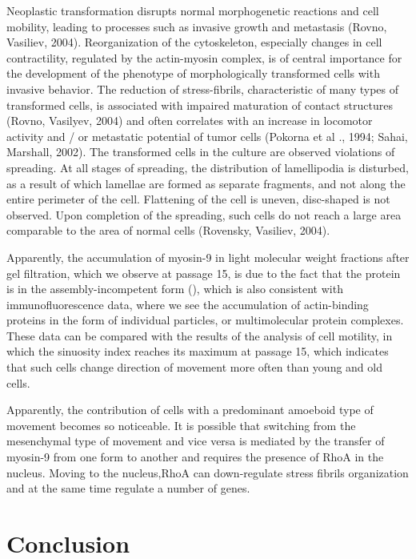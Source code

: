 \documentclass[english,authoryear]{elsarticle}
\begin{document}
Neoplastic transformation disrupts normal morphogenetic reactions and cell mobility, leading to processes such as invasive growth and metastasis (Rovno, Vasiliev, 2004). Reorganization of the cytoskeleton, especially changes in cell contractility, regulated by the actin-myosin complex, is of central importance for the development of the phenotype of morphologically transformed cells with invasive behavior. The reduction of stress-fibrils, characteristic of many types of transformed cells, is associated with impaired maturation of contact structures (Rovno, Vasilyev, 2004) and often correlates with an increase in locomotor activity and / or metastatic potential of tumor cells (Pokorna et al ., 1994; Sahai, Marshall, 2002). The transformed cells in the culture are observed violations of spreading. At all stages of spreading, the distribution of lamellipodia is disturbed, as a result of which lamellae are formed as separate fragments, and not along the entire perimeter of the cell. Flattening of the cell is uneven, disc-shaped is not observed. Upon completion of the spreading, such cells do not reach a large area comparable to the area of normal cells (Rovensky, Vasiliev, 2004).

Apparently, the accumulation of myosin-9 in light molecular weight fractions after gel filtration, which we observe at passage 15, is due to the fact that the protein is in the assembly-incompetent form (\cite{vicente2009non}), which is also consistent with immunofluorescence data, where we see the accumulation of actin-binding proteins in the form of individual particles, or multimolecular protein complexes.
These data can be compared with the results of the analysis of cell motility, in which the sinuosity index reaches its maximum at passage 15, which indicates that such cells change direction of movement more often than young and old cells.

Apparently, the contribution of cells with a predominant amoeboid type of movement becomes so noticeable.
It is possible that switching from the mesenchymal type of movement and vice versa is mediated by the transfer of myosin-9 from one form to another and requires the presence of RhoA in the nucleus.
Moving to the nucleus,RhoA can down-regulate stress fibrils organization and at the same time regulate a number of genes.


\section*{Conclusion}
\end{document}
